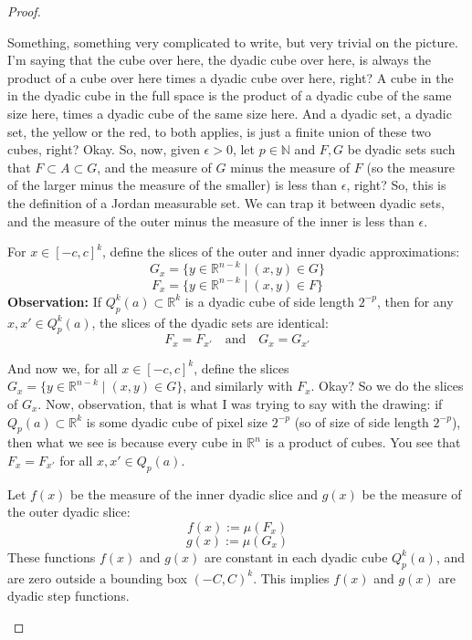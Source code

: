 \begin{proof}
\begin{spoken-clean}[00:06:57 - 00:08:14]
Something, something very complicated to write, but very trivial on the picture. I'm saying that the cube over here, the dyadic cube over here, is always the product of a cube over here times a dyadic cube over here, right? A cube in the in the dyadic cube in the full space is the product of a dyadic cube of the same size here, times a dyadic cube of the same size here. And a dyadic set, a dyadic set, the yellow or the red, to both applies, is just a finite union of these two cubes, right? Okay. So, now, given $\epsilon > 0$, let $p \in \mathbb{N}$ and $F,G$ be dyadic sets such that $F \subset A \subset G$, and the measure of $G$ minus the measure of $F$ (so the measure of the larger minus the measure of the smaller) is less than $\epsilon$, right? So, this is the definition of a Jordan measurable set. We can trap it between dyadic sets, and the measure of the outer minus the measure of the inner is less than $\epsilon$.
\end{spoken-clean}

\begin{math-stroke}
For $x \in [-c,c]^k$, define the slices of the outer and inner dyadic approximations:
\[
G_x = \{ y \in \mathbb{R}^{n-k} \mid (x,y) \in G \}
\]
\[
F_x = \{ y \in \mathbb{R}^{n-k} \mid (x,y) \in F \}
\]
\textbf{Observation:} If $Q_p^k(a) \subset \mathbb{R}^k$ is a dyadic cube of side length $2^{-p}$, then for any $x, x' \in Q_p^k(a)$, the slices of the dyadic sets are identical:
\[
F_x = F_{x'} \quad \text{and} \quad G_x = G_{x'}
\]
\end{math-stroke}

\begin{spoken-clean}[00:08:14 - 00:09:50]
And now we, for all $x \in [-c,c]^k$, define the slices $G_x = \{y \in \mathbb{R}^{n-k} \mid (x,y) \in G \}$, and similarly with $F_x$. Okay? So we do the slices of $G_x$. Now, observation, that is what I was trying to say with the drawing: if $Q_p(a) \subset \mathbb{R}^k$ is some dyadic cube of pixel size $2^{-p}$ (so of size of side length $2^{-p}$), then what we see is because every cube in $\mathbb{R}^n$ is a product of cubes. You see that $F_x = F_{x'}$ for all $x, x' \in Q_p(a)$.
\end{spoken-clean}

\begin{math-stroke}
Let $f(x)$ be the measure of the inner dyadic slice and $g(x)$ be the measure of the outer dyadic slice:
\[
f(x) := \mu(F_x)
\]
\[
g(x) := \mu(G_x)
\]
These functions $f(x)$ and $g(x)$ are constant in each dyadic cube $Q_p^k(a)$, and are zero outside a bounding box $(-C,C)^k$. This implies $f(x)$ and $g(x)$ are dyadic step functions.
\end{math-stroke}


\end{proof}
